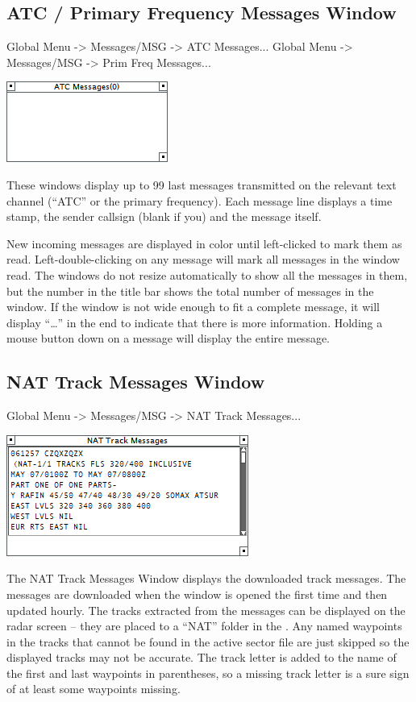 \documentclass[11pt,a4paper]{memoir}
\newcommand{\colorref}[1]{\textit{\hyperref[#1]{\StrDel{#1}{color:}}}}
\begin{document}
\subsection{ATC / Primary Frequency Messages Window}
\label{win:atcmw}
\label{win:pfmw}

Global Menu -> Messages/MSG -> ATC Messages...
Global Menu -> Messages/MSG -> Prim Freq Messages...

\includegraphics{img/atc.png}

These windows display up to 99 last messages transmitted on the relevant text channel (“ATC” or the primary frequency). Each message line displays a time stamp, the sender callsign (blank if you) and the message itself.

New incoming messages are displayed in \colorref{color:Warning} color until left-clicked to mark them as read. Left-double-clicking on any message will mark all messages in the window read. The windows do not resize automatically to show all the messages in them, but the number in the title bar shows the total number of messages in the window. If the window is not wide enough to fit a complete message, it will display “…” in the end to indicate that there is more information. Holding a mouse button down on a message will display the entire message.

\subsection{NAT Track Messages Window}
\label{win:nattmw}

Global Menu -> Messages/MSG -> NAT Track Messages...

\includegraphics{img/nat.png}

The NAT Track Messages Window displays the downloaded track messages. The messages are downloaded when the window is opened the first time and then updated hourly. The tracks extracted from the messages can be displayed on the radar screen – they are placed to a “NAT” folder in the \textit{}. Any named waypoints in the tracks that cannot be found in the active sector file are just skipped so the displayed tracks may not be accurate. The track letter is added to the name of the first and last waypoints in parentheses, so a missing track letter is a sure sign of at least some waypoints missing.
\end{document}
